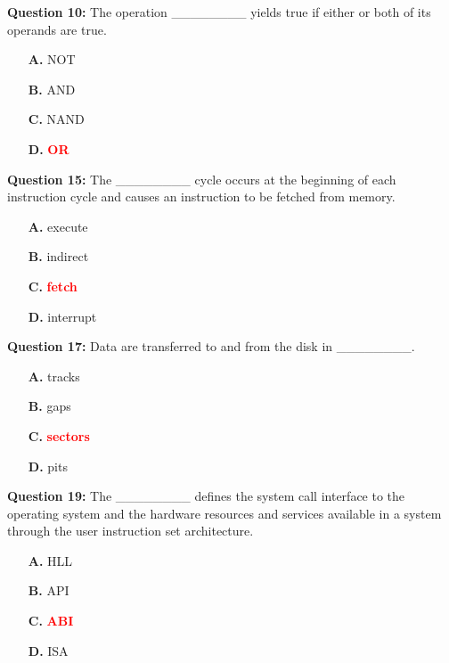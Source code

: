 \documentclass[12pt,a4paper]{article}
\begin{document}
\vspace{0.5cm}

\textbf{Question 10:} The operation ________ yields true if either or both of its operands are true.

\begin{itemize}
    \item[\textbf{A.}] NOT
    \item[\textbf{B.}] AND
    \item[\textbf{C.}] NAND
    \item[\textbf{D.}] \textcolor{red}{\textbf{OR}}
\end{itemize}

\vspace{0.5cm}

\textbf{Question 15:} The ________ cycle occurs at the beginning of each instruction cycle and causes an instruction to be fetched from memory.

\begin{itemize}
    \item[\textbf{A.}] execute
    \item[\textbf{B.}] indirect
    \item[\textbf{C.}] \textcolor{red}{\textbf{fetch}}
    \item[\textbf{D.}] interrupt
\end{itemize}

\vspace{0.5cm}

\textbf{Question 17:} Data are transferred to and from the disk in ________.

\begin{itemize}
    \item[\textbf{A.}] tracks
    \item[\textbf{B.}] gaps
    \item[\textbf{C.}] \textcolor{red}{\textbf{sectors}}
    \item[\textbf{D.}] pits
\end{itemize}

\vspace{0.5cm}

\textbf{Question 19:} The ________ defines the system call interface to the operating system and the hardware resources and services available in a system through the user instruction set architecture.

\begin{itemize}
    \item[\textbf{A.}] HLL
    \item[\textbf{B.}] API
    \item[\textbf{C.}] \textcolor{red}{\textbf{ABI}}
    \item[\textbf{D.}] ISA
\end{itemize}
\end{document}
